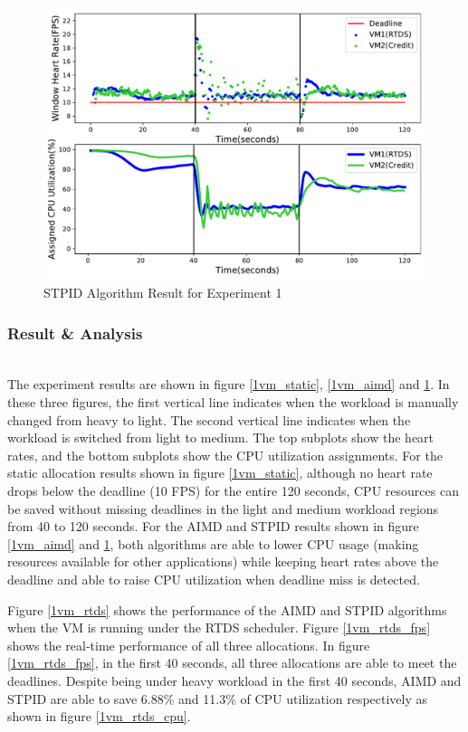 \begin{figure}[h!]
\centering
\includegraphics[width=1\linewidth]{images/1vm_apid}
\caption{STPID Algorithm Result for Experiment 1}
\label{1vm_apid}
\end{figure}



\subsubsection*{Result \& Analysis}\hfill\\
\indent The experiment results are shown in figure \ref{1vm_static}, \ref{1vm_aimd} and \ref{1vm_apid}. In these three figures, the first vertical line indicates when the workload is manually changed from heavy to light. The second vertical line indicates when the workload is switched from light to medium. The top subplots show the heart rates, and the bottom subplots show the CPU utilization assignments. For the static allocation results shown in figure \ref{1vm_static}, although no heart rate drops below the deadline (10 FPS) for the entire 120 seconds, CPU resources can be saved without missing deadlines in the light and medium workload regions from 40 to 120 seconds. For the AIMD and STPID results shown in figure \ref{1vm_aimd} and \ref{1vm_apid}, both algorithms are able to lower CPU usage (making resources available for other applications) while keeping heart rates above the deadline and able to raise CPU utilization when deadline miss is detected. 

Figure \ref{1vm_rtds} shows the performance of the AIMD and STPID algorithms when the VM is running under the RTDS scheduler. Figure \ref{1vm_rtds_fps} shows the real-time performance of all three allocations. In figure \ref{1vm_rtds_fps}, in the first 40 seconds, all three allocations are able to meet the deadlines. Despite being under heavy workload in the first 40 seconds, AIMD and STPID are able to save 6.88\% and 11.3\% of CPU utilization respectively as shown in figure \ref{1vm_rtds_cpu}. 


